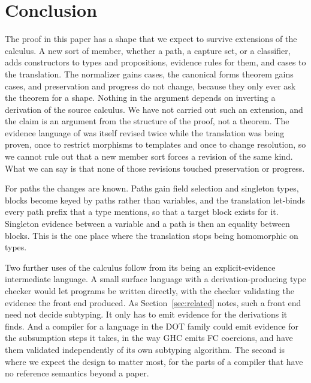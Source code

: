 \section{Conclusion}\label{sec:conclusion}

The proof in this paper has a shape that we expect to survive extensions of the calculus. A new sort of member, whether a path, a capture set, or a classifier, adds constructors to types and propositions, evidence rules for them, and cases to the translation. The normalizer gains cases, the canonical forms theorem gains cases, and preservation and progress do not change, because they only ever ask the theorem for a shape. Nothing in the argument depends on inverting a derivation of the source calculus. We have not carried out such an extension, and the claim is an argument from the structure of the proof, not a theorem. The evidence language of \FCdot was itself revised twice while the translation was being proven, once to restrict morphisms to templates and once to change resolution, so we cannot rule out that a new member sort forces a revision of the same kind. What we can say is that none of those revisions touched preservation or progress.

For paths the changes are known. Paths gain field selection and singleton types, blocks become keyed by paths rather than variables, and the translation let-binds every path prefix that a type mentions, so that a target block exists for it. Singleton evidence between a variable and a path is then an equality between blocks. This is the one place where the translation stops being homomorphic on types.

Two further uses of the calculus follow from its being an explicit-evidence intermediate language. A small surface language with a derivation-producing type checker would let programs be written directly, with the \FCdot checker validating the evidence the front end produced. As Section~\ref{sec:related} notes, such a front end need not decide subtyping. It only has to emit evidence for the derivations it finds. And a compiler for a language in the DOT family could emit evidence for the subsumption steps it takes, in the way GHC emits FC coercions, and have them validated independently of its own subtyping algorithm. The second is where we expect the design to matter most, for the parts of a compiler that have no reference semantics beyond a paper.
